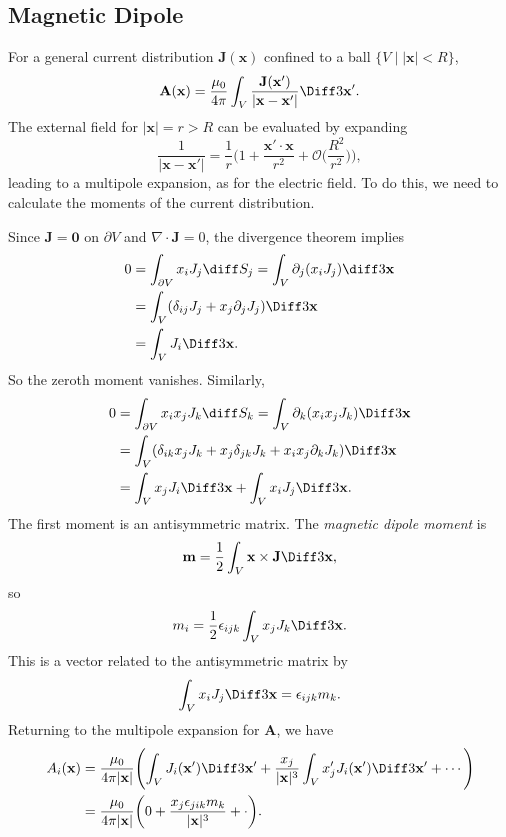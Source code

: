 \documentclass[12pt]{article}
\begin{document}
\subsection{Magnetic Dipole}
\label{sub:magnetic_dipole}

For a general current distribution $\mathbf{J}(\mathbf{x})$ confined to a ball $\{V \mid |\mathbf{x}| < R\}$,
\[
\mathbf{A}(\mathbf{x}) = \frac{\mu_0}{4 \pi} \int_{V} \frac{\mathbf{J}(\mathbf{x'})}{|\mathbf{x} - \mathbf{x}'|} \Diff3 \mathbf{x}'
.\]
The external field for $|\mathbf{x}| = r > R$ can be evaluated by expanding
\[
\frac{1}{|\mathbf{x} - \mathbf{x}'|} = \frac{1}{r} \biggl( 1 + \frac{\mathbf{x}' \cdot \mathbf{x}}{r^2} + \mathcal{O}\biggl(\frac{R^2}{r^2} \biggr) \biggr)
,\]
leading to a multipole expansion, as for the electric field. To do this, we need to calculate the moments of the current distribution.

Since $\mathbf{J} = \mathbf{0}$ on $\partial V$ and $\nabla \cdot \mathbf{J} = 0$, the divergence theorem implies
\begin{align*}
	0 &= \int_{\partial V} x_i J_j \diff S_j = \int_{V} \partial_j (x_i J_j) \diff3 \mathbf{x} \\
	  &= \int_{V} (\delta_{ij} J_j + x_j \partial_j J_j) \Diff3 \mathbf{x} \\
	  &= \int_{V} J_i \Diff3 \mathbf{x}
.\end{align*}
So the zeroth moment vanishes. Similarly,
\begin{align*}
	0 &= \int_{\partial V} x_i x_j J_k \diff S_k = \int_{V} \partial_k (x_i x_j J_k) \Diff3 \mathbf{x} \\
	  &= \int_{V}(\delta_{ik} x_j J_k + x_j \delta_{jk} J_k + x_i x_j \partial_k J_k) \Diff3 \mathbf{x} \\
	  &= \int_{V} x_j J_i \Diff3 \mathbf{x} + \int_{V} x_i J_j \Diff3 \mathbf{x}.
\end{align*}
The first moment is an antisymmetric matrix. The \emph{magnetic dipole moment} is
\[
	\mathbf{m} = \frac{1}{2} \int_{V} \mathbf{x} \times \mathbf{J} \Diff3 \mathbf{x}
,\]
so
\[
m_i = \frac{1}{2} \epsilon_{ijk} \int_{V} x_j J_k \Diff3 \mathbf{x}
.\]
This is a vector related to the antisymmetric matrix by
\[
\int_{V} x_i J_j \Diff3 \mathbf{x} = \epsilon_{ijk} m_k
.\]
Returning to the multipole expansion for $\mathbf{A}$, we have
\begin{align*}
	A_i(\mathbf{x}) &= \frac{\mu_0}{4 \pi |\mathbf{x}|} \Biggl( \int_{V} J_i(\mathbf{x}') \Diff3 \mathbf{x}'+ \frac{x_j}{|\mathbf{x}|^3} \int_{V} x_j' J_i(\mathbf{x}') \Diff3 \mathbf{x}' + \cdots \Biggr) \\
	&= \frac{\mu_0}{4 \pi|\mathbf{x}|} \biggl( 0 + \frac{x_j \epsilon_{jik} m_k}{|\mathbf{x}|^3} + \cdot \biggr).
\end{align*}
\end{document}
